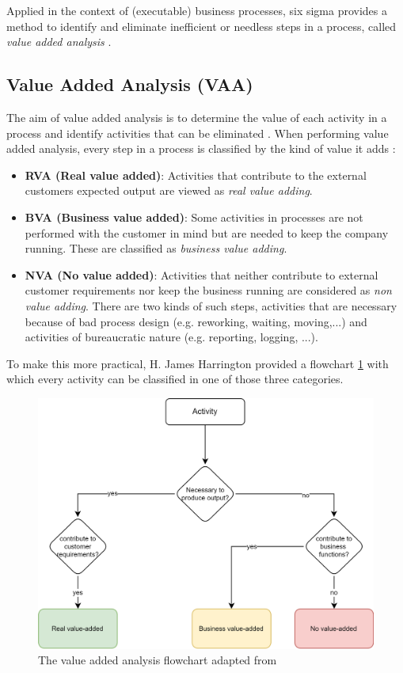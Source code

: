 Applied in the context of (executable) business processes, six sigma provides a method to identify and eliminate inefficient or needless steps in a process, called \textit{value added analysis} \cite{vom2014handbook}. 


\subsection{Value Added Analysis (VAA)}\label{vaa}

The aim of value added analysis is to determine the value of each activity in a process and identify activities that can be eliminated \cite{fundamentals}\cite{harrington2016value}. When performing value added analysis, every step in a process is classified by the kind of value it adds \cite{harrington2016value}: 

\begin{itemize}
	\item \textbf{RVA (Real value added)}: Activities that contribute to the external customers expected output are viewed as \textit{real value adding}. 
	\item \textbf{BVA (Business value added)}: Some activities in processes are not performed with the customer in mind but are needed to  keep the company running. These are classified as \textit{business value adding}.
	\item \textbf{NVA (No value added)}: Activities that neither contribute to external customer requirements nor keep the business running are considered as \textit{non value adding}. There are two kinds of such steps, activities that are necessary because of bad process design (e.g. reworking, waiting, moving,...) and activities of bureaucratic nature (e.g. reporting, logging, ...).
\end{itemize}

To make this more practical, H. James Harrington provided a flowchart \ref{fig:VAA-flow} with which every activity can be classified in one of those three categories\cite{harrington2016value}.

\begin{figure}[H]
	\centering
	\includegraphics[width=0.8\columnwidth]{graphics/VAA}
	\caption{The value added analysis flowchart adapted from \cite{harrington2016value}} 
	\label{fig:VAA-flow} 
\end{figure}

